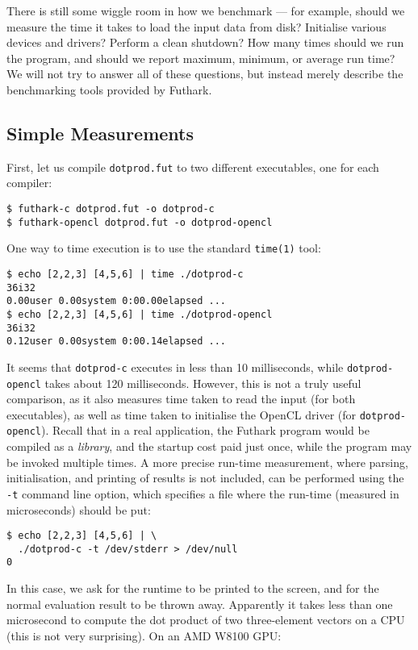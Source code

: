 \documentclass[oneside,11pt]{book}
\begin{document}
There is still some wiggle room in how we benchmark --- for example,
should we measure the time it takes to load the input data from disk?
Initialise various devices and drivers?  Perform a clean shutdown?
How many times should we run the program, and should we report
maximum, minimum, or average run time?  We will not try to answer all
of these questions, but instead merely describe the benchmarking tools
provided by Futhark.

\subsection{Simple Measurements}

First, let us compile \texttt{dotprod.fut} to two different
executables, one for each compiler:

\begin{verbatim}
$ futhark-c dotprod.fut -o dotprod-c
$ futhark-opencl dotprod.fut -o dotprod-opencl
\end{verbatim}

One way to time execution is to use the standard \texttt{time(1)}
tool:

\begin{verbatim}
$ echo [2,2,3] [4,5,6] | time ./dotprod-c
36i32
0.00user 0.00system 0:00.00elapsed ...
$ echo [2,2,3] [4,5,6] | time ./dotprod-opencl
36i32
0.12user 0.00system 0:00.14elapsed ...
\end{verbatim}

It seems that \texttt{dotprod-c} executes in less than 10
milliseconds, while \texttt{dotprod-opencl} takes about 120
milliseconds.  However, this is not a truly useful comparison, as it
also measures time taken to read the input (for both executables), as
well as time taken to initialise the OpenCL driver (for
\texttt{dotprod-opencl}).  Recall that in a real application, the
Futhark program would be compiled as a \textit{library}, and the
startup cost paid just once, while the program may be invoked multiple
times.  A more precise run-time measurement, where parsing,
initialisation, and printing of results is not included, can be
performed using the \texttt{-t} command line option, which specifies a
file where the run-time (measured in microseconds) should be put:

\begin{verbatim}
$ echo [2,2,3] [4,5,6] | \
  ./dotprod-c -t /dev/stderr > /dev/null
0
\end{verbatim}

In this case, we ask for the runtime to be printed to the screen, and
for the normal evaluation result to be thrown away.  Apparently it
takes less than one microsecond to compute the dot product of two
three-element vectors on a CPU (this is not very surprising).  On an
AMD W8100 GPU:
\end{document}

